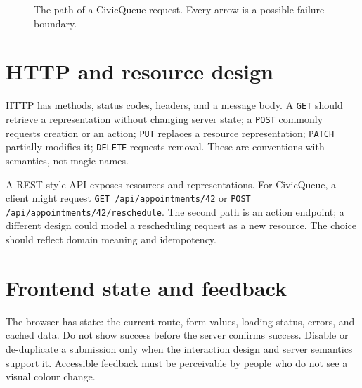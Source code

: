 \begin{figure}[H]
\centering
{}
\caption{The path of a CivicQueue request. Every arrow is a possible failure boundary.}
\label{fig:request-path}
\end{figure}

\section{HTTP and resource design}
HTTP has methods, status codes, headers, and a message body. A \texttt{GET} should retrieve a representation without changing server state; a \texttt{POST} commonly requests creation or an action; \texttt{PUT} replaces a resource representation; \texttt{PATCH} partially modifies it; \texttt{DELETE} requests removal. These are conventions with semantics, not magic names.

A REST-style API exposes resources and representations. For CivicQueue, a client might request \texttt{GET /api/appointments/42} or \texttt{POST /api/appointments/42/reschedule}. The second path is an action endpoint; a different design could model a rescheduling request as a new resource. The choice should reflect domain meaning and idempotency.

\section{Frontend state and feedback}
The browser has state: the current route, form values, loading status, errors, and cached data. Do not show success before the server confirms success. Disable or de-duplicate a submission only when the interaction design and server semantics support it. Accessible feedback must be perceivable by people who do not see a visual colour change.

